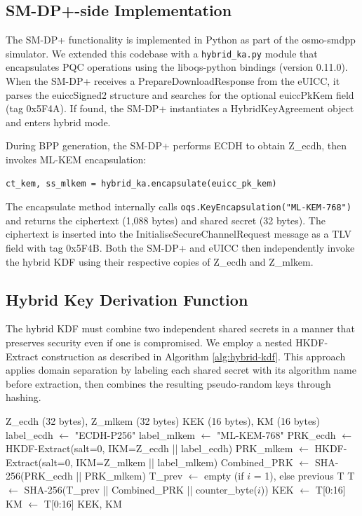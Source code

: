 \documentclass{easychair}
\begin{document}
\subsection{SM-DP+-side Implementation}

The SM-DP+ functionality is implemented in Python as part of the osmo-smdpp simulator. We extended this codebase with a \texttt{hybrid\_ka.py} module that encapsulates PQC operations using the liboqs-python bindings (version 0.11.0). When the SM-DP+ receives a PrepareDownloadResponse from the eUICC, it parses the euiccSigned2 structure and searches for the optional euiccPkKem field (tag 0x5F4A). If found, the SM-DP+ instantiates a HybridKeyAgreement object and enters hybrid mode.

During BPP generation, the SM-DP+ performs ECDH to obtain Z\_ecdh, then invokes ML-KEM encapsulation:

\begin{verbatim}
ct_kem, ss_mlkem = hybrid_ka.encapsulate(euicc_pk_kem)
\end{verbatim}

The encapsulate method internally calls \texttt{oqs.KeyEncapsulation("ML-KEM-768")} and returns the ciphertext (1,088 bytes) and shared secret (32 bytes). The ciphertext is inserted into the InitialiseSecureChannelRequest message as a TLV field with tag 0x5F4B. Both the SM-DP+ and eUICC then independently invoke the hybrid KDF using their respective copies of Z\_ecdh and Z\_mlkem.

\subsection{Hybrid Key Derivation Function}

The hybrid KDF must combine two independent shared secrets in a manner that preserves security even if one is compromised. We employ a nested HKDF-Extract construction as described in Algorithm \ref{alg:hybrid-kdf}. This approach applies domain separation by labeling each shared secret with its algorithm name before extraction, then combines the resulting pseudo-random keys through hashing.

\begin{algorithm}[h]
\caption{Hybrid Session Key Derivation}
\label{alg:hybrid-kdf}
\begin{algorithmic}[1]
\REQUIRE Z\_ecdh (32 bytes), Z\_mlkem (32 bytes)
\ENSURE KEK (16 bytes), KM (16 bytes)
\STATE label\_ecdh $\leftarrow$ "ECDH-P256"
\STATE label\_mlkem $\leftarrow$ "ML-KEM-768"
\STATE PRK\_ecdh $\leftarrow$ HKDF-Extract(salt=0, IKM=Z\_ecdh || label\_ecdh)
\STATE PRK\_mlkem $\leftarrow$ HKDF-Extract(salt=0, IKM=Z\_mlkem || label\_mlkem)
\STATE Combined\_PRK $\leftarrow$ SHA-256(PRK\_ecdh || PRK\_mlkem)
    \STATE T\_prev $\leftarrow$ empty (if $i$ = 1), else previous T
    \STATE T $\leftarrow$ SHA-256(T\_prev || Combined\_PRK || counter\_byte($i$))
        \STATE KEK $\leftarrow$ T[0:16]
    \ELSE
        \STATE KM $\leftarrow$ T[0:16]
    \ENDIF
\ENDFOR
\RETURN KEK, KM
\end{algorithmic}
\end{algorithm}
\end{document}
